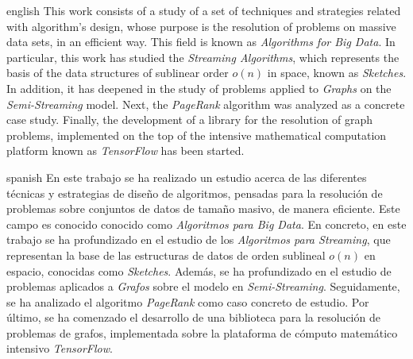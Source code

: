 \documentclass{subfiles}
\newenvironment{abstractpage}
  {\cleardoublepage\vspace*{\fill}\thispagestyle{empty}}
  {\vfill\cleardoublepage}
\newenvironment{abstract-lang}[1]
  {\bigskip\selectlanguage{#1}%
   \begin{center}\bfseries\abstractname\end{center}}
  {\par\bigskip}
\begin{document}
  \begin{abstractpage}
    \begin{abstract-lang}{english}
      This work consists of a study of a set of techniques and strategies related with algorithm's design, whose purpose is the resolution of problems on massive data sets, in an efficient way. This field is known as \emph{Algorithms for Big Data}. In particular, this work has studied the \emph{Streaming Algorithms}, which represents the basis of the data structures of sublinear order $o(n)$ in space, known as \emph{Sketches}. In addition, it has deepened in the study of problems applied to \emph{Graphs} on the \emph{Semi-Streaming} model. Next, the \emph{PageRank} algorithm was analyzed as a concrete case study. Finally, the development of a library for the resolution of graph problems, implemented on the top of the intensive mathematical computation platform known as \emph{TensorFlow} has been started.
    \end{abstract-lang}
    \begin{abstract-lang}{spanish}
      En este trabajo se ha realizado un estudio acerca de las diferentes técnicas y estrategias de diseño de algoritmos, pensadas para la resolución de problemas sobre conjuntos de datos de tamaño masivo, de manera eficiente. Este campo es conocido conocido como \emph{Algoritmos para Big Data}. En concreto, en este trabajo se ha profundizado en el estudio de los \emph{Algoritmos para Streaming}, que representan la base de las estructuras de datos de orden sublineal $o(n)$ en espacio, conocidas como \emph{Sketches}. Además, se ha profundizado en el estudio de problemas aplicados a \emph{Grafos} sobre el modelo en \emph{Semi-Streaming}. Seguidamente, se ha analizado el algoritmo \emph{PageRank} como caso concreto de estudio. Por último, se ha comenzado el desarrollo de una biblioteca para la resolución de problemas de grafos, implementada sobre la plataforma de cómputo matemático intensivo \emph{TensorFlow}.
    \end{abstract-lang}
  \end{abstractpage}
\end{document}
